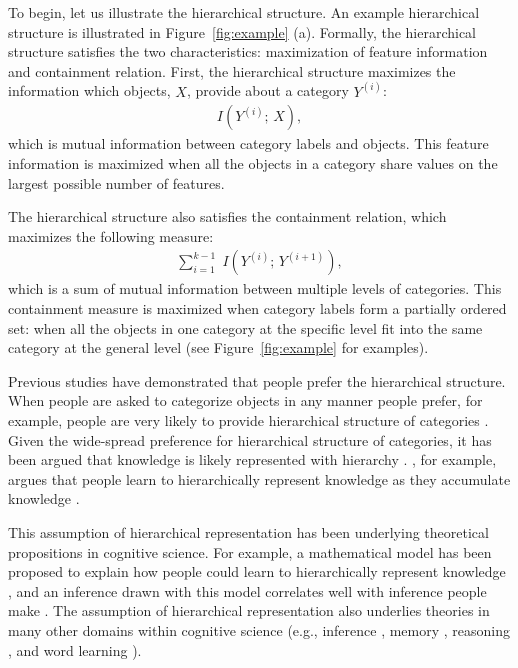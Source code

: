 \documentclass[doc]{apa6}
\begin{document}
To begin, let us illustrate the hierarchical structure.  An example hierarchical structure is
illustrated in Figure~\ref{fig:example} (a).  Formally, the hierarchical structure satisfies the two
characteristics: maximization of feature information and containment relation.  First, the
hierarchical structure maximizes the information which objects, $X$, provide about a category
$Y^{(i)}$:
\begin{align}
    I \left( Y^{(i)};\, X \right),
\label{eqn:feature}
\end{align}
which is mutual information between category labels and objects. This feature information is
maximized when all the objects in a category share values on the largest possible number of
features.

The hierarchical structure also satisfies the containment relation, which maximizes the following
measure:
\begin{align}
    \sum_{i=1}^{k-1} \; I \left( Y^{(i)};\, Y^{(i + 1)} \right),
\label{eqn:containment}
\end{align}
which is a sum of mutual information between multiple levels of categories. This containment measure
is maximized when category labels form a partially ordered set: when all the objects in one category
at the specific level fit into the same category at the general level (see Figure~\ref{fig:example} for
examples).

Previous studies have demonstrated that people prefer the hierarchical structure.  When people are
asked to categorize objects in any manner people prefer, for example, people are very likely to
provide hierarchical structure of categories \parencite[e.g.,][]{Rosch1976a}.  Given the wide-spread
preference for hierarchical structure of categories, it has been argued that knowledge is likely
represented with hierarchy \parencite[e.g.,][]{Markman1984a, Markman1989a}.
\textcite{Markman1989a}, for example, argues that people learn to hierarchically represent knowledge
as they accumulate knowledge \parencite[see also][]{Vygotsky1962a, Inhelder1964a}.

This assumption of hierarchical representation has been underlying theoretical propositions in
cognitive science. For example, a mathematical model has been proposed to explain how people could
learn to hierarchically represent knowledge \parencite{Kemp2008a}, and an inference drawn with this
model correlates well with inference people make \parencite{Kemp2009a}.  The assumption of
hierarchical representation also underlies theories in many other domains within cognitive science
(e.g., inference \parencite{Osherson1990a}, memory \parencite{Bower1969a, Glass1975a}, reasoning
\parencite{Collins1989a, Shastri1993a}, and word learning \parencite{Xu2007a}).
\end{document}
